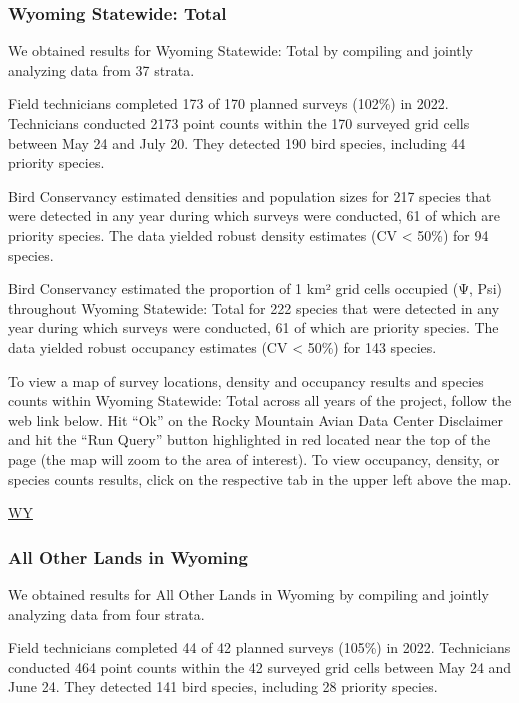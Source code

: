 \documentclass[
  letterpaper,
  DIV=11,
  numbers=noendperiod,
  oneside]{scrreprt}
\begin{document}
\hypertarget{wyoming-statewide-total}{%
\subsubsection{Wyoming Statewide: Total}\label{wyoming-statewide-total}}

We obtained results for Wyoming Statewide: Total by compiling and
jointly analyzing data from 37 strata.

Field technicians completed 173 of 170 planned surveys (102\%) in 2022.
Technicians conducted 2173 point counts within the 170 surveyed grid
cells between May 24 and July 20. They detected 190 bird species,
including 44 priority species.

Bird Conservancy estimated densities and population sizes for 217
species that were detected in any year during which surveys were
conducted, 61 of which are priority species. The data yielded robust
density estimates (CV \textless{} 50\%) for 94 species.

Bird Conservancy estimated the proportion of 1 km² grid cells occupied
(Ψ, Psi) throughout Wyoming Statewide: Total for 222 species that were
detected in any year during which surveys were conducted, 61 of which
are priority species. The data yielded robust occupancy estimates (CV
\textless{} 50\%) for 143 species.

To view a map of survey locations, density and occupancy results and
species counts within Wyoming Statewide: Total across all years of the
project, follow the web link below. Hit ``Ok'' on the Rocky Mountain
Avian Data Center Disclaimer and hit the ``Run Query'' button
highlighted in red located near the top of the page (the map will zoom
to the area of interest). To view occupancy, density, or species counts
results, click on the respective tab in the upper left above the map.

\href{http://www.rmbo.org/new_site/adc/QueryWindow.aspx\#N4IgzgrgDgpgTmALnAhoiBbEAuABCAdQE0QBfIA=}{WY}

\hypertarget{all-other-lands-in-wyoming}{%
\subsubsection{All Other Lands in
Wyoming}\label{all-other-lands-in-wyoming}}

We obtained results for All Other Lands in Wyoming by compiling and
jointly analyzing data from four strata.

Field technicians completed 44 of 42 planned surveys (105\%) in 2022.
Technicians conducted 464 point counts within the 42 surveyed grid cells
between May 24 and June 24. They detected 141 bird species, including 28
priority species.
\end{document}
